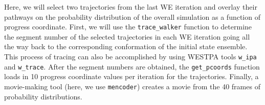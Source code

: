 Here, we will select two trajectories from the last WE iteration and overlay their pathways on the probability distribution of the overall simulation as a function of progress coordinate. 
First, we will use the \verb|trace_walker| function to determine the segment number of the selected trajectories in each WE iteration going all the way back to the corresponding conformation of the initial state ensemble. 
This process of tracing can also be accomplished by using WESTPA tools \verb|w_ipa| and \verb|w_trace|. 
After the segment numbers are obtained, the \verb|get_pcoords| function loads in 10 progress coordinate values per iteration for the trajectories. 
Finally, a movie-making tool (here, we use \verb|mencoder|) creates a movie from the 40 frames of probability distributions. 
